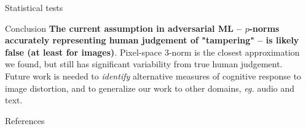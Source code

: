 \documentclass[final,notheorems]{beamer}
\newlength{\sepwidth}
\newlength{\colwidth}
\newcommand{\separatorcolumn}{\begin{column}{\sepwidth}\end{column}}
\begin{document}
\begin{frame}[t]
\begin{columns}[t]
\begin{column}{\colwidth}
\begin{block}{Statistical tests}
  \end{block}

  \begin{alertblock}{Conclusion}
    \textbf{The current assumption in adversarial ML -- $p$-norms accurately representing human judgement of "tampering" -- is likely false (at least for images)}. Pixel-space $3$-norm is the closest approximation we found, but still has significant variability from true human judgement. Future work is needed to \emph{identify} alternative measures of cognitive response to image distortion, and to generalize our work to other domains, \textit{eg.} audio and text.
  \end{alertblock}

  \begin{block}{References}
    \footnotesize{\printbibliography}
  \end{block}

\end{column}

\separatorcolumn
\end{columns}
\end{frame}
\end{document}
